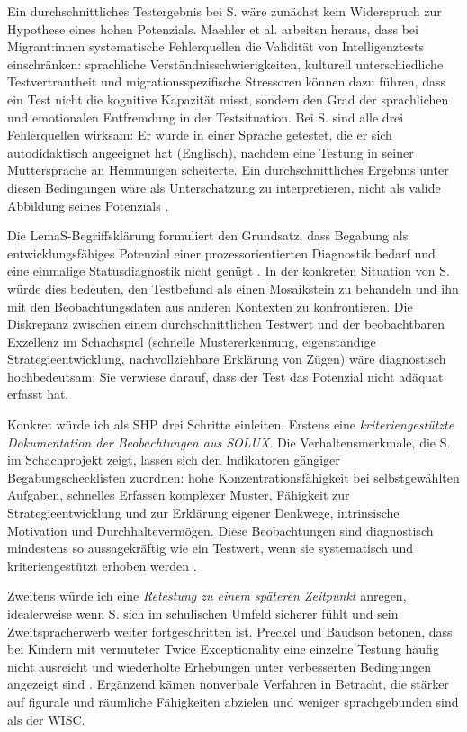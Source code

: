 \documentclass[ngerman, a4paper]{article}
\begin{document}
Ein durchschnittliches Testergebnis bei S. wäre zunächst kein Widerspruch zur
Hypothese eines hohen Potenzials. Maehler et al. arbeiten heraus, dass bei
Migrant:innen systematische Fehlerquellen die Validität von Intelligenztests
einschränken: sprachliche Verständnisschwierigkeiten, kulturell unterschiedliche
Testvertrautheit und migrationsspezifische Stressoren können dazu führen, dass ein
Test nicht die kognitive Kapazität misst, sondern den Grad der sprachlichen und
emotionalen Entfremdung in der Testsituation. Bei S. sind alle drei Fehlerquellen
wirksam: Er wurde in einer Sprache getestet, die er sich autodidaktisch angeeignet
hat (Englisch), nachdem eine Testung in seiner Muttersprache an Hemmungen scheiterte.
Ein durchschnittliches Ergebnis unter diesen Bedingungen wäre als Unterschätzung zu
interpretieren, nicht als valide Abbildung seines Potenzials
\parencite{maehler2018diagnostik}.

Die LemaS-Begriffsklärung formuliert den Grundsatz, dass Begabung als
entwicklungsfähiges Potenzial einer prozessorientierten Diagnostik bedarf und eine
einmalige Statusdiagnostik nicht genügt \parencite{lemas2023begriffsklaerung}. In
der konkreten Situation von S. würde dies bedeuten, den Testbefund als einen
Mosaikstein zu behandeln und ihn mit den Beobachtungsdaten aus anderen Kontexten
zu konfrontieren. Die Diskrepanz zwischen einem durchschnittlichen Testwert und der
beobachtbaren Exzellenz im Schachspiel (schnelle Mustererkennung, eigenständige
Strategieentwicklung, nachvollziehbare Erklärung von Zügen) wäre diagnostisch
hochbedeutsam: Sie verwiese darauf, dass der Test das Potenzial nicht adäquat
erfasst hat.

Konkret würde ich als SHP drei Schritte einleiten. Erstens eine
\textit{kriteriengestützte Dokumentation der Beobachtungen aus SOLUX}. Die
Verhaltensmerkmale, die S. im Schachprojekt zeigt, lassen sich den Indikatoren
gängiger Begabungschecklisten zuordnen: hohe Konzentrationsfähigkeit bei
selbstgewählten Aufgaben, schnelles Erfassen komplexer Muster, Fähigkeit zur
Strategieentwicklung und zur Erklärung eigener Denkwege, intrinsische Motivation
und Durchhaltevermögen. Diese Beobachtungen sind diagnostisch mindestens so
aussagekräftig wie ein Testwert, wenn sie systematisch und kriteriengestützt
erhoben werden \parencite{trautmann2016einfuehrung,ipege2009professionelle}.

Zweitens würde ich eine \textit{Retestung zu einem späteren Zeitpunkt} anregen,
idealerweise wenn S. sich im schulischen Umfeld sicherer fühlt und sein
Zweitspracherwerb weiter fortgeschritten ist. Preckel und Baudson betonen, dass
bei Kindern mit vermuteter Twice Exceptionality eine einzelne Testung häufig
nicht ausreicht und wiederholte Erhebungen unter verbesserten Bedingungen
angezeigt sind \parencite{preckel2013hochbegabung}. Ergänzend kämen nonverbale
Verfahren in Betracht, die stärker auf figurale und räumliche Fähigkeiten
abzielen und weniger sprachgebunden sind als der WISC.
\end{document}
